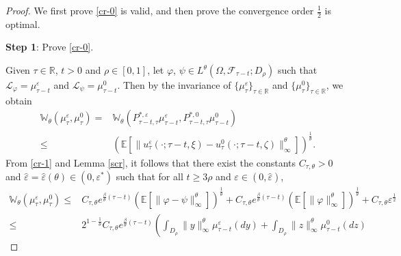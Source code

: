 \documentclass[11pt]{article}
\numberwithin{equation}{section}
\theoremstyle{plain}
\begin{document}
\begin{proof}
We first prove \eqref{cr-0} is valid,
and then prove the convergence order $\frac{1}{2}$ is optimal.


 {\bf Step 1}: Prove \eqref{cr-0}.
 
 Given $\tau \in \mathbb{R}$, $t > 0$ and $\rho \in [0,1]$, 
 let $\varphi$,
  $\psi \in L^{\theta}(\Omega, \mathcal{F}_{\tau-t}; D_\rho)$ such that   
         $\mathcal{L}_{\varphi} = \mu_{\tau-t}^\varepsilon$ 
 and $\mathcal{L}_{\psi} = \mu_{\tau-t}^0$.
 Then by the invariance  of $\{ \mu_\tau^\varepsilon \}_{\tau \in \mathbb{R} }$ and $\{ \mu_\tau^0 \}_{\tau \in \mathbb{R} }$, we obtain
    \begin{align} \label{cr-1}
        \mathbb{W}_\theta \left( \mu_{\tau}^\varepsilon, \mu_{\tau}^0 \right) 
    = & \mathbb{W}_\theta 
                       \left( P_{\tau-t, \tau}^{\ast,\varepsilon} \mu_{\tau-t}^\varepsilon,
                                P_{\tau-t, \tau}^{\ast, 0} \mu_{\tau-t}^0
                       \right)  \nonumber\\
 \le & \left( \mathbb{E}
                              \left[ \| u^\varepsilon_\tau(\cdot; \tau-t, \xi) - u^0_\tau(\cdot; \tau-t, \zeta)  
                                       \|_\infty^\theta
                              \right]
              \right)^{\frac{1}{\theta} }.
 \end{align}             
 From \eqref{cr-1} and Lemma \ref{scr}, 
 it follows that there exist the constants $C_{\tau, \theta} > 0$ and $\hat{\varepsilon} = \hat{\varepsilon}(\theta) \in (0, \varepsilon^*)$ such that for all $t \ge 3\rho$ and $\varepsilon \in (0, \hat{\varepsilon} )$,
   \begin{align} \label{cr-2}
       \mathbb{W}_\theta \left( \mu_{\tau}^\varepsilon, \mu_{\tau}^0 \right) 
\le & C_{\tau, \theta} e^{\frac{\beta}{\theta} (\tau-t) }
            \left( \mathbb{E}
                             \left[ \| \varphi - \psi \|_\infty^\theta
                             \right]
            \right)^{\frac{1}{\theta} }  
         + C_{\tau, \theta} e^{\frac{\beta}{\theta} (\tau-t) }
                      \left( \mathbb{E} \left[ \|\varphi\|_{\infty}^{\theta} \right] \right)^{\frac{1}{\theta} }
         + C_{\tau, \theta} \varepsilon^{\frac{1}{2} } \nonumber\\
\le & 2^{1-\frac{1}{\theta} } C_{\tau, \theta} e^{\frac{\beta}{\theta} (\tau-t) }
             \left( \int_{D_\rho} \|y\|_\infty^\theta \mu_{\tau-t}^\varepsilon(dy)
                      + \int_{D_\rho}  \|z\|_\infty^\theta \mu_{\tau-t}^0(dz)

\end{align}
\end{proof}
\end{document}
